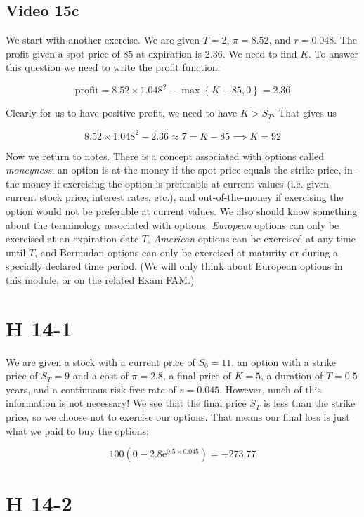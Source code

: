 \documentclass[12pt, letterpaper]{article}
\newcommand{\e}{\mathrm{e}}
\begin{document}
    \subsection{Video 15c}

    We start with another exercise. We are given \(T = 2\), \(\pi = 8.52\), and \(r = 0.048\). The profit given a spot price of \(85\) at expiration is \(2.36\). We need to find \(K\). To answer this question we need to write the profit function:

    \[ \text{profit} = 8.52 \times 1.048^2 - \max\left\{K - 85,0\right\} = 2.36   \]

    Clearly for us to have positive profit, we need to have \(K > S_T\). That gives us

    \[ 8.52 \times 1.048^2 - 2.36 \approx 7 = K - 85 \implies K = 92       \]

    Now we return to notes. There is a concept associated with options called \emph{moneyness}: an option is at-the-money if the spot price equals the strike price, in-the-money if exercising the option is preferable at current values (i.e. given current stock price, interest rates, etc.), and out-of-the-money if exercising the option would not be preferable at current values. We also should know something about the terminology associated with options: \emph{European} options can only be exercised at an expiration date \(T\), \emph{American} options can be exercised at any time until \(T\), and Bermudan options can only be exercised at maturity or during a specially declared time period. (We will only think about European options in this module, or on the related Exam FAM.)

    \section{H 14-1}

    We are given a stock with a current price of \(S_0 = 11\), an option with a strike price of \(S_T = 9\) and a cost of \(\pi = 2.8\), a final price of \(K = 5\), a duration of \(T = 0.5\) years, and a continuous risk-free rate of \(r = 0.045\). However, much of this information is not necessary! We see that the final price \(S_T\) is less than the strike price, so we choose not to exercise our options. That means our final loss is just what we paid to buy the options:

    \[ 100 \left( 0 - 2.8 \e^{0.5 \times 0.045} \right) = -273.77  \]

    \section{H 14-2}
\end{document}
